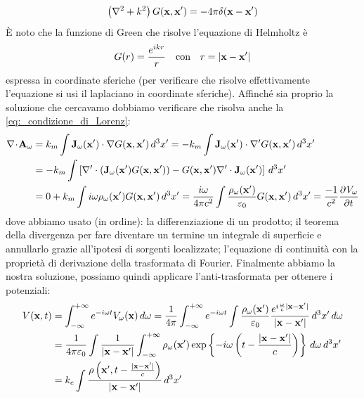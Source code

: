 \begin{align}
  \left( \nabla^2 + k^2 \right)G(\mathbf{ x },\mathbf{ x }') = -4\pi \delta(\mathbf{ x }-\mathbf{ x }')
\end{align}
È noto che la funzione di Green che risolve l'equazione di Helmholtz è 
\begin{align}
  G(r) = \frac{e^{ikr}}{r} \quad \text{con} \quad r = |\mathbf{ x }-\mathbf{ x }'|
\end{align}
espressa in coordinate sferiche (per verificare che risolve effettivamente l'equazione si usi il laplaciano in coordinate sferiche). Affinché sia proprio 
la soluzione che cercavamo dobbiamo verificare che risolva anche la \eqref{eq:_condizione_di_Lorenz}: 
\begin{align}
  \nabla\!\cdot\!\mathbf{ A }_\omega &= k_m \int \mathbf{ J }_\omega(\mathbf{ x' }) \cdot \nabla G(\mathbf{ x },\mathbf{ x }') \,d^3x' 
  = - k_m \int \mathbf{ J }_\omega(\mathbf{ x' }) \cdot \nabla' G(\mathbf{ x },\mathbf{ x }') \,d^3x' 
  \\
  &= - k_m \int \left[ \nabla' \cdot \left( \mathbf{ J }_\omega(\mathbf{ x' }) G(\mathbf{ x },\mathbf{ x }') \right) 
  - G(\mathbf{ x },\mathbf{ x }') \nabla' \cdot \mathbf{ J }_\omega(\mathbf{ x' }) \right] \,d^3x' 
  \\
  &= 0 + k_m \int i\omega \rho_\omega(\mathbf{ x }') G(\mathbf{ x }, \mathbf{ x }') \,d^3x' 
  = \frac{i\omega}{4\pi c^2} \int  \frac{\rho_\omega(\mathbf{ x }')}{\varepsilon_0} G(\mathbf{ x }, \mathbf{ x }') \,d^3x' = \frac{-1}{c^2} \frac{\partial^{} {V_\omega}}{\partial {t}^{}}
\end{align}
dove abbiamo usato (in ordine): la differenziazione di un prodotto; il teorema della divergenza per fare diventare un termine un integrale di superficie 
e annullarlo grazie all'ipotesi di sorgenti localizzate; l'equazione di continuità con la proprietà di derivazione della trasformata di Fourier. 
Finalmente abbiamo la nostra soluzione, possiamo quindi applicare l'anti-trasformata per ottenere i potenziali:
\begin{align} 
  V(\mathbf{ x },t) &= \int_{-\infty}^{+\infty} e^{-i\omega t}V_\omega(\mathbf{ x }) \,d\omega 
  = \frac{1}{4\pi} \int_{-\infty}^{+\infty} e^{-i\omega t} \int \frac{\rho_\omega(\mathbf{ x }')}{\varepsilon_0} 
  \frac{e^{i\frac{\omega}{c} |\mathbf{ x-x' }|}}{|\mathbf{ x - x' }|} \,d^3x'\,d\omega
  \\
  &= \frac{1}{4\pi \varepsilon_0} \int \frac{1}{|\mathbf{ x-x' }|} \int_{-\infty}^{+\infty} \rho_\omega(\mathbf{ x' }) 
  \exp\left\{ -i\omega \left( t - \frac{|\mathbf{ x-x' }|}{c} \right) \right\} \,d\omega \,d^3x' 
  \\
  &= k_e \int \frac{\rho\left( \mathbf{ x }', t - \frac{|\mathbf{ x-x' }|}{c} \right)}{|\mathbf{ x-x' }|} \,d^3x'
  \label{eq:_potenziale_scalare_ritardato}
\end{align}
